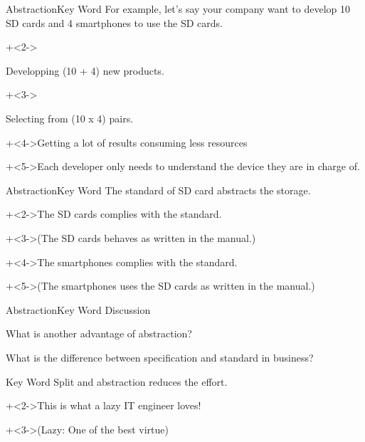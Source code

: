 \begin{frame}[t]{Abstraction}{Key Word}
    For example, let's say your company want to develop 10 SD cards and 4 smartphones to use the SD cards.
    \vspace{4ex}

    \begin{itemize}
        \onslide+<2->{\item[Cost]   Developping (10 + 4) new products.}
        \onslide+<3->{\item[Usage]    Selecting from (10 x 4) pairs.}
    \end{itemize}
    \vspace{4ex}

    \onslide+<4->{Getting a lot of results consuming less resources}
    \vspace{2ex}

    \onslide+<5->{Each developer only needs to understand the device they are in charge of.}
\end{frame}


\begin{frame}{Abstraction}{Key Word}
    The standard of SD card abstracts the storage.
    \vspace{4ex}

    \onslide+<2->{The SD cards complies with the standard.}
    \vspace{2ex}

    \onslide+<3->{(The SD cards behaves as written in the manual.)}
    \vspace{4ex}

    \onslide+<4->{The smartphones complies with the standard.}
    \vspace{2ex}

    \onslide+<5->{(The smartphones uses the SD cards as written in the manual.)}
\end{frame}


\begin{frame}{Abstraction}{Key Word}
    Discussion
    \vspace{4ex}

    What is another advantage of abstraction?
    \vspace{2ex}

    What is the difference between specification and standard in business?
\end{frame}


\begin{frame}{Key Word}
    Split and abstraction reduces the effort.
    \vspace{4ex}

    \onslide+<2->{This is what a lazy IT engineer loves!}
    \vspace{2ex}

    \onslide+<3->{{\Large (Lazy: One of the best virtue)}}
\end{frame}


